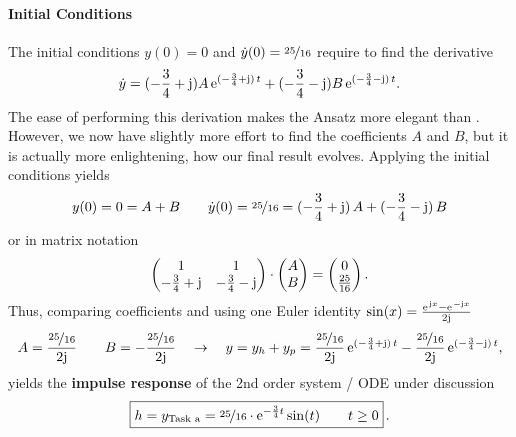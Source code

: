 \documentclass[11pt,a4paper,DIV=12]{scrartcl}
\begin{document}
\paragraph{Initial Conditions}
\label{Sec:TaskaInitCond}
The initial conditions $y(0)=0$ and $\dot{y}(0)=\nicefrac{25}{16}$ require to find
the derivative
\begin{align}
\dot{y} =
(-\frac{3}{4}+\im) A \, \mathrm{e}^{(-\frac{3}{4}+\im)\,t} +
(-\frac{3}{4}-\im) B \, \mathrm{e}^{(-\frac{3}{4}-\im)\,t}.
\end{align}
%
The ease of performing this derivation makes the Ansatz 
more elegant than .
%
However, we now have slightly more effort to find the coefficients $A$ and $B$,
but it is actually more enlightening, how our final result evolves.
%
Applying the initial conditions yields
%
\begin{align}
y(0) = 0 = A + B
\qquad
\dot{y}(0) = \nicefrac{25}{16} =
(-\frac{3}{4}+\im) \, A + (-\frac{3}{4}-\im) \, B
\end{align}
or in matrix notation
\begin{align}
	\begin{pmatrix}
		1 & 1 \\
		-\frac{3}{4}+\im & -\frac{3}{4}-\im
	\end{pmatrix}
	\cdot
	\begin{pmatrix}
		A \\
		B
	\end{pmatrix}
	=
	\begin{pmatrix}
		0 \\
		\frac{25}{16}
	\end{pmatrix}. \nonumber
\end{align}
Thus, comparing coefficients and using one Euler identity
$\sin(x) = \frac{\e^{\im x}-\e^{-\im x}}{2\im}$
\begin{align}
A = \frac{\nicefrac{25}{16}}{2\im}\qquad B = -\frac{\nicefrac{25}{16}}{2\im}
\quad\rightarrow\quad
y = y_h + y_p =
 \frac{\nicefrac{25}{16}}{2\im} \, \mathrm{e}^{(-\frac{3}{4}+\im)\,t}
-\frac{\nicefrac{25}{16}}{2\im} \, \mathrm{e}^{(-\frac{3}{4}-\im)\,t},
\end{align}
yields the \textbf{impulse response} of the 2nd order system / ODE under discussion
\begin{align}
\boxed{
h = y_\text{Task a} = \nicefrac{25}{16} \cdot \mathrm{e}^{-\frac{3}{4} t} \sin(t) \qquad t\geq0
}\,.
\end{align}
\end{document}
